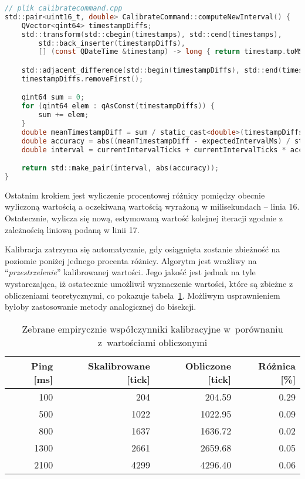 \begin{lstlisting}[language=C,
    caption={Algorytm wyznaczania kolejnej wartości dla funkcjonalności kalibracji},
    label={lst:calibration-cpp}]
// plik calibratecommand.cpp
std::pair<uint16_t, double> CalibrateCommand::computeNewInterval() {
	QVector<qint64> timestampDiffs;
	std::transform(std::cbegin(timestamps), std::cend(timestamps),
		std::back_inserter(timestampDiffs),
		[] (const QDateTime &timestamp) -> long { return timestamp.toMSecsSinceEpoch(); });

	std::adjacent_difference(std::begin(timestampDiffs), std::end(timestampDiffs), std::begin(timestampDiffs));
	timestampDiffs.removeFirst();

	qint64 sum = 0;
	for (qint64 elem : qAsConst(timestampDiffs)) {
		sum += elem;
	}
	double meanTimestampDiff = sum / static_cast<double>(timestampDiffs.size());
	double accuracy = abs((meanTimestampDiff - expectedIntervalMs) / static_cast<double>(expectedIntervalMs));
	double interval = currentIntervalTicks + currentIntervalTicks * accuracy; // this isn't stable if we overshoot the correct value...

	return std::make_pair(interval, abs(accuracy));
}
\end{lstlisting}


Ostatnim krokiem jest wyliczenie procentowej różnicy pomiędzy obecnie wyliczoną wartością
a oczekiwaną wartością wyrażoną w milisekundach -- linia 16. Ostatecznie, wylicza się
nową, estymowaną wartość kolejnej iteracji zgodnie z zależnością liniową podaną w linii 17.

Kalibracja zatrzyma się automatycznie, gdy osiągnięta zostanie zbieżność na poziomie poniżej
jednego procenta różnicy. Algorytm jest wrażliwy na \enquote{\textit{przestrzelenie}} kalibrowanej
wartości. Jego jakość jest jednak na tyle wystarczająca, iż ostatecznie umożliwił wyznaczenie
wartości, które są zbieżne z obliczeniami teoretycznymi, co pokazuje tabela~\ref{tab:calibration_vs_computation}.
Możliwym usprawnieniem byłoby zastosowanie metody analogicznej do bisekcji.

\begin{table}[!ht]
\centering
	\begin{tabular}{r|r|r|r}
	Ping [ms]         & Skalibrowane [tick] & Obliczone [tick]  & Różnica [\%] \\\hline
	100               & 204                 & 204.59            & 0.29         \\\hline
	500               & 1022                & 1022.95           & 0.09         \\\hline
	800               & 1637                & 1636.72           & 0.02         \\\hline
	1300              & 2661                & 2659.68           & 0.05         \\\hline
	2100              & 4299                & 4296.40           & 0.06         \\\hline
	\end{tabular}
\caption{\label{tab:calibration_vs_computation}Zebrane empirycznie współczynniki kalibracyjne w~porównaniu z~wartościami obliczonymi}
\end{table}

